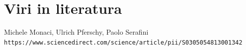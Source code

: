 \documentclass[a4paper,12pt]{article}
\theoremstyle{definition}
\begin{document}
\newpage
\section{Viri in literatura}

\begin{thebibliography}{9}

    Michele Monaci, Ulrich Pferschy, Paolo Serafini 
    \\\texttt{https://www.sciencedirect.com/science/article/pii/S0305054813001342}


\end{thebibliography}
\end{document}
